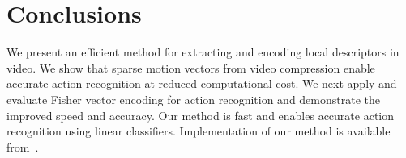 \documentclass[10pt,twocolumn,letterpaper]{article}
\begin{document}
\section{Conclusions}
We present an efficient method for extracting and encoding local descriptors in video. We show that sparse motion vectors from video compression enable accurate action recognition at reduced computational cost. We next apply and evaluate Fisher vector encoding for action recognition and demonstrate the improved speed and accuracy.
Our method is fast and enables accurate action recognition using linear classifiers. Implementation of our method is available from~\cite{projectpage}.


{
\small


}
\end{document}
